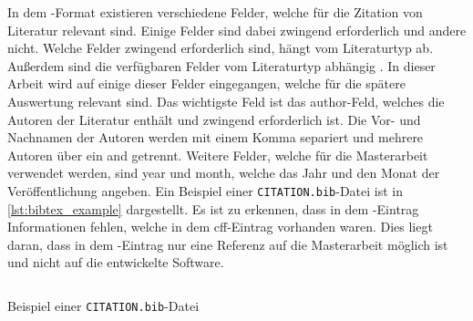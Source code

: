 In dem -Format existieren verschiedene Felder, welche für die Zitation von Literatur relevant sind.
Einige Felder sind dabei zwingend erforderlich und andere nicht.
Welche Felder zwingend erforderlich sind, hängt vom Literaturtyp ab.
Außerdem sind die verfügbaren Felder vom Literaturtyp abhängig \autocite{patashnik_bibtexing_1988}.
In dieser Arbeit wird auf einige dieser Felder eingegangen, welche für die spätere Auswertung relevant sind.
Das wichtigste Feld ist das \glqq author\grqq{}-Feld, welches die Autoren der Literatur enthält und zwingend erforderlich ist.
Die Vor- und Nachnamen der Autoren werden mit einem Komma separiert und mehrere Autoren über ein \glqq and\grqq{} getrennt.
Weitere Felder, welche für die Masterarbeit verwendet werden, sind \glqq year\grqq{} und \glqq month\grqq{}, welche das Jahr und den Monat der Veröffentlichung angeben.
Ein Beispiel einer \texttt{CITATION.bib}-Datei ist in \autoref{lst:bibtex_example} dargestellt.
Es ist zu erkennen, dass in dem -Eintrag Informationen fehlen, welche in dem \gls{cff}-Eintrag vorhanden waren.
Dies liegt daran, dass in dem -Eintrag nur eine Referenz auf die Masterarbeit möglich ist und nicht auf die entwickelte Software.

\begin{listing}
  \inputminted{text}{../CITATION.bib}
  \caption{Beispiel einer \texttt{CITATION.bib}-Datei}
  \label{lst:bibtex_example}
\end{listing}
